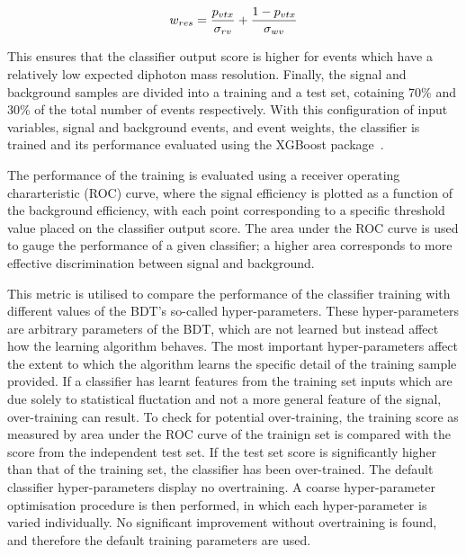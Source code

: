 \begin{equation}
  w_{res} = \frac{p_{vtx}}{\sigma_{rv}} + \frac{1-p_{vtx}}{\sigma_{wv}}
\end{equation}

This ensures that the classifier output score is higher for events 
which have a relatively low expected diphoton mass resolution.
Finally, the signal and background samples are divided into a training and a test set,
cotaining 70\% and 30\% of the total number of events respectively.
With this configuration of input variables, signal and background events, and event weights, 
the classifier is trained and its performance evaluated using the XGBoost package~\cite{XGBoost}.

The performance of the training is evaluated using a receiver operating chararteristic (ROC) curve, 
where the signal efficiency is plotted as a function of the background efficiency,
with each point corresponding to a specific threshold value placed on the classifier output score.
The area under the ROC curve is used to gauge the performance of a given classifier; 
a higher area corresponds to more effective discrimination between signal and background.


This metric is utilised to compare the performance of the classifier training 
with different values of the BDT's so-called hyper-parameters.
These hyper-parameters are arbitrary parameters of the BDT, 
which are not learned but instead affect how the learning algorithm behaves.
The most important hyper-parameters affect the extent to which 
the algorithm learns the specific detail of the training sample provided.
If a classifier has learnt features from the training set inputs
which are due solely to statistical fluctation and not a more general feature of the signal, 
over-training can result.
To check for potential over-training, the training score as measured by area under the ROC curve 
of the trainign set is compared with the score from the independent test set.
If the test set score is significantly higher than that of the training set, 
the classifier has been over-trained.
The default classifier hyper-parameters display no overtraining.
A coarse hyper-parameter optimisation procedure is then performed, 
in which each hyper-parameter is varied individually.
No significant improvement without overtraining is found, 
and therefore the default training parameters are used.

